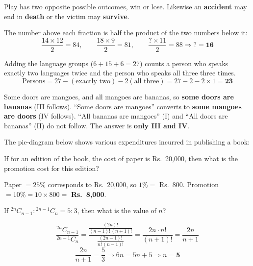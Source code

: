 Play has two opposite possible outcomes, win or lose. Likewise an \textbf{accident} may end in \textbf{death} or the victim may \textbf{survive}.

The number above each fraction is half the product of the two numbers below it:
\[\frac{14\times12}{2}=84,\qquad\frac{18\times9}{2}=81,\qquad\frac{?\times11}{2}=88\Rightarrow ?=\mathbf{16}\]

Adding the language groups ($6+15+6=27$) counts a person who speaks exactly two languages twice and the person who speaks all three three times.
\[\text{Persons}=27-(\text{exactly two})-2(\text{all three})=27-2-2\times1=\mathbf{23}\]

\begin{center}
\end{center}
Some doors are mangoes, and all mangoes are bananas, so \textbf{some doors are bananas} (III follows). ``Some doors are mangoes'' converts to \textbf{some mangoes are doors} (IV follows). ``All bananas are mangoes'' (I) and ``All doors are bananas'' (II) do not follow. The answer is \textbf{only III and IV}.

The pie-diagram below shows various expenditures incurred in publishing a book:


If for an edition of the book, the cost of paper is Rs.~20,000, then what is the promotion cost for this edition?

Paper $=25\%$ corresponds to Rs.~20,000, so $1\%=$ Rs.~800.
Promotion $=10\%=10\times800=$ \textbf{Rs.~8,000}.

If ${}^{2n}C_{n-1} : {}^{2n-1}C_{n} = 5:3$, then what is the value of $n$?

\[\frac{{}^{2n}C_{n-1}}{{}^{2n-1}C_n}=\frac{\frac{(2n)!}{(n-1)!\,(n+1)!}}{\frac{(2n-1)!}{n!\,(n-1)!}}=\frac{2n\cdot n!}{(n+1)!}=\frac{2n}{n+1}\]
\[\frac{2n}{n+1}=\frac53\Rightarrow6n=5n+5\Rightarrow n=\mathbf{5}\]

